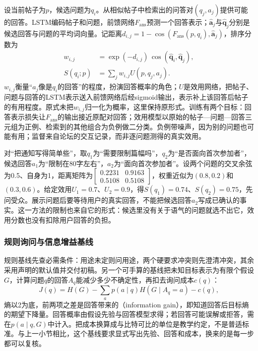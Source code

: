 设当前帖子为$p$，候选问题为$q_i$。从相似帖子中检索出的问答对$(q_j,a_j)$提供可能的回答。LSTM编码帖子和问题，前馈网络$F_{\mathrm{ans}}$预测一个回答表示；$\widehat{\bm{a}}_j$与$\widehat{\bm{q}}_j$分别是候选回答与问题的平均词向量。记距离$d_{i,j}=1-\cos(F_{\mathrm{ans}}(p,q_i),\widehat{\bm{a}}_j)$，排序分数为
\begin{equation}
\begin{aligned}
 w_{i,j}&=\exp(-d_{i,j})\,
            \cos(\widehat{\bm{q}}_i,\widehat{\bm{q}}_j),\\
 S(q_i;p)&=\sum_j w_{i,j}U(p,q_j,a_j).
\end{aligned}
\label{eq:nlp-dialogue-evpi}
\end{equation}
$w_{i,j}$衡量“$a_j$像是$q_i$的回答”的程度，扮演回答概率的角色；$U$是效用网络，把帖子、问题与回答的LSTM表示送入前馈网络后经sigmoid输出，表示补上该回答后帖子的有用程度。原式未把$w_{i,j}$归一化为概率，这里保持原形式。训练有两个目标：回答表示损失让$F_{\mathrm{ans}}$的输出接近原配对回答；效用模型以原始的帖子—问题—回答三元组为正例、检索到的其他组合为负例做二分类。负例带噪声，因为别的问题也可能有用；监督来自论坛的交互记录，而非逐问题测得的真实效用。

对“把通知写得简单些”，取$q_1$为“需要限制篇幅吗”，$q_2$为“是否面向首次参加者”，候选回答$a_1$为“限制在80字左右”，$a_2$为“面向首次参加者”。设两个问题的交叉余弦为0.5、自身为1，距离矩阵为$\left[\begin{smallmatrix}0.2231&0.9163\\0.5108&0.5108\end{smallmatrix}\right]$，权重近似为$(0.8,0.2)$和$(0.3,0.6)$。给定效用$U_1=0.7$、$U_2=0.9$，得$S(q_1)=0.74$、$S(q_2)=0.75$，先问受众。展示问题后要等待用户的真实回答，不能把候选回答$a_2$写成已确认的事实。这一方法的限制也来自它的形式：候选里没有关于语气的问题就选不出它，效用分数也没有扣除用户回答的负担。

\subsubsection{规则询问与信息增益基线}
\label{sec:nlp-dialogue-information-gain}

规则基线先查必需条件：用途未定则问用途，两个硬要求冲突则先澄清冲突，其余采用声明的默认值并交付初稿。另一个可手算的基线把未知目标表示为有限个假设$G$，计算问题$q$的回答$A_q$能减少多少不确定性，再扣去询问成本$c(q)$：
\begin{equation}
 J(q)=H(G)-\sum_a p(a\mid q)H(G\mid A_q=a)-c(q),
 \label{eq:nlp-dialogue-information-gain}
\end{equation}
熵以2为底，前两项之差是回答带来的（information gain），即知道回答后目标熵的期望下降量。回答概率由假设先验与回答模型求得；若回答可能误解或拒答，需在$p(a\mid q,G)$中计入。把成本换算成与比特可比的单位是教学约定，不是普适标准。与上一小节相比，这个基线要求显式写出先验、回答和成本，换来的是每一步都可以复核。

